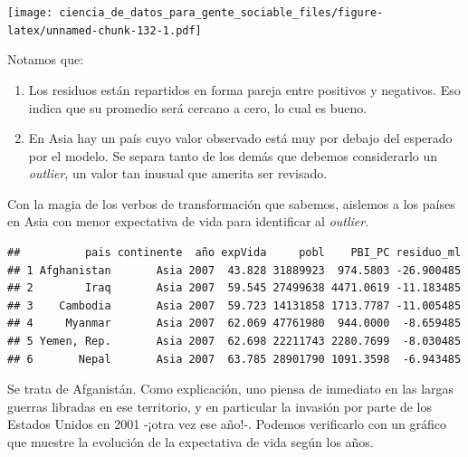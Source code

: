 \documentclass[]{book}
\newenvironment{Shaded}{\begin{snugshade}}{\end{snugshade}}
\newcommand{\KeywordTok}[1]{\textcolor[rgb]{0.13,0.29,0.53}{\textbf{#1}}}
\newcommand{\DecValTok}[1]{\textcolor[rgb]{0.00,0.00,0.81}{#1}}
\newcommand{\StringTok}[1]{\textcolor[rgb]{0.31,0.60,0.02}{#1}}
\newcommand{\OperatorTok}[1]{\textcolor[rgb]{0.81,0.36,0.00}{\textbf{#1}}}
\newcommand{\NormalTok}[1]{#1}
\providecommand{\tightlist}{%
  \setlength{\itemsep}{0pt}\setlength{\parskip}{0pt}}
\begin{document}
\texttt{[image: ciencia\_de\_datos\_para\_gente\_sociable\_files/figure-latex/unnamed-chunk-132-1.pdf]}

Notamos que:

\begin{enumerate}
\def\labelenumi{\arabic{enumi}.}
\tightlist
\item
  Los residuos están repartidos en forma pareja entre positivos y
  negativos. Eso indica que su promedio será cercano a cero, lo cual es
  bueno.
\item
  En Asia hay un país cuyo valor observado está muy por debajo del
  esperado por el modelo. Se separa tanto de los demás que debemos
  considerarlo un \emph{outlier}, un valor tan inusual que amerita ser
  revisado.
\end{enumerate}

Con la magia de los verbos de transformación que sabemos, aislemos a los
países en Asia con menor expectativa de vida para identificar al
\emph{outlier}.

\begin{Shaded}
\end{Shaded}

\begin{verbatim}
##          pais continente  año expVida     pobl    PBI_PC residuo_ml
## 1 Afghanistan       Asia 2007  43.828 31889923  974.5803 -26.900485
## 2        Iraq       Asia 2007  59.545 27499638 4471.0619 -11.183485
## 3    Cambodia       Asia 2007  59.723 14131858 1713.7787 -11.005485
## 4     Myanmar       Asia 2007  62.069 47761980  944.0000  -8.659485
## 5 Yemen, Rep.       Asia 2007  62.698 22211743 2280.7699  -8.030485
## 6       Nepal       Asia 2007  63.785 28901790 1091.3598  -6.943485
\end{verbatim}

Se trata de Afganistán. Como explicación, uno piensa de inmediato en las
largas guerras libradas en ese territorio, y en particular la invasión
por parte de los Estados Unidos en 2001 -¡otra vez ese año!-. Podemos
verificarlo con un gráfico que muestre la evolución de la expectativa de
vida según los años.
\end{document}
